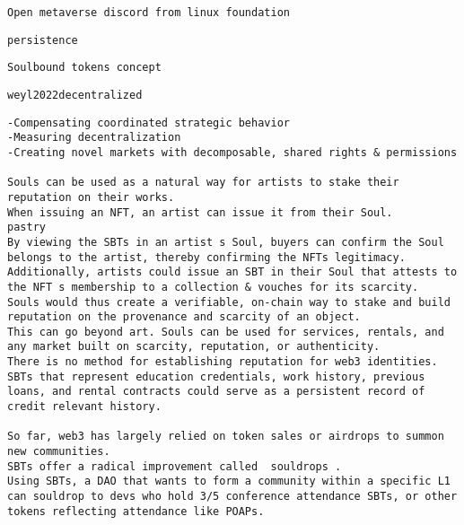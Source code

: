         \protect\hypertarget{ID_458109320}{}{}

\begin{verbatim}
Open metaverse discord from linux foundation
\end{verbatim}
       
     

     
     
      \protect\hypertarget{ID_925886137}{}{}

\begin{verbatim}
persistence
\end{verbatim}

       
       
        \protect\hypertarget{ID_1916194587}{}{}

\begin{verbatim}
Soulbound tokens concept
\end{verbatim}

         
         
          \protect\hypertarget{ID_1972989938}{}{}

\begin{verbatim}
weyl2022decentralized
\end{verbatim}
         

         
         
          \protect\hypertarget{ID_1502095167}{}{}

\begin{verbatim}
-Compensating coordinated strategic behavior
-Measuring decentralization
-Creating novel markets with decomposable, shared rights & permissions
                       
Souls can be used as a natural way for artists to stake their reputation on their works.
When issuing an NFT, an artist can issue it from their Soul.
pastry
By viewing the SBTs in an artist s Soul, buyers can confirm the Soul belongs to the artist, thereby confirming the NFTs legitimacy.
Additionally, artists could issue an SBT in their Soul that attests to the NFT s membership to a collection & vouches for its scarcity.
Souls would thus create a verifiable, on-chain way to stake and build reputation on the provenance and scarcity of an object.
This can go beyond art. Souls can be used for services, rentals, and any market built on scarcity, reputation, or authenticity.
There is no method for establishing reputation for web3 identities.
SBTs that represent education credentials, work history, previous loans, and rental contracts could serve as a persistent record of credit relevant history.
                                           
So far, web3 has largely relied on token sales or airdrops to summon new communities.
SBTs offer a radical improvement called  souldrops .
Using SBTs, a DAO that wants to form a community within a specific L1 can souldrop to devs who hold 3/5 conference attendance SBTs, or other tokens reflecting attendance like POAPs.
\end{verbatim}
         
